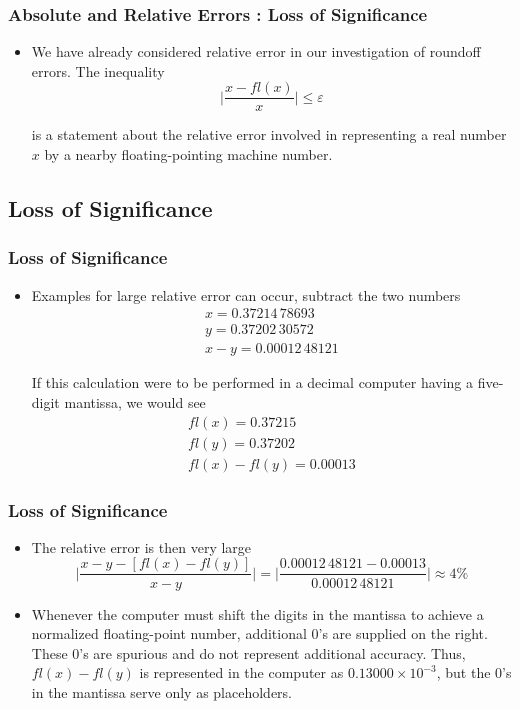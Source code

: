 \documentclass[notheorems,mathserif,table,compress]{beamer}  %
\begin{document}
\begin{frame}
\frametitle{Absolute and Relative Errors : Loss of Significance}
\begin{itemize}
\item We have already considered relative error in our investigation of roundoff errors. The inequality 
\begin{displaymath}
\bigg|\frac{x-fl(x)}{x}\bigg|\leq \varepsilon
\end{displaymath}

is a statement about the relative error involved in representing a real number $x$ by a nearby floating-pointing machine number.
\end{itemize}
\end{frame}

\subsection{Loss of Significance} 

\begin{frame}
\frametitle{Loss of Significance}
\begin{itemize}
\item Examples for large relative error can occur, subtract the two numbers
\begin{eqnarray*}
x=0.37214\,78693 \\
y=0.37202\,30572 \\
x−y=0.00012\,48121
\end{eqnarray*}

If this calculation were to be performed in a decimal computer having a five-digit mantissa, we would see
\begin{eqnarray*}
fl(x)=0.37215 \\
fl(y)=0.37202 \\
fl(x)−fl(y)=0.00013
\end{eqnarray*}

\end{itemize}
\end{frame}

\begin{frame}
\frametitle{Loss of Significance}
\begin{itemize}
\item The relative error is then very large
\begin{displaymath}
\bigg|\frac{x-y-[fl(x)-fl(y)]}{x-y}\bigg|=\bigg|\frac{0.00012\,48121-0.00013}{0.00012\,48121}\bigg|\approx4\%
\end{displaymath}

\item Whenever the computer must shift the digits in the mantissa to achieve a normalized floating-point number, additional 0's are supplied on the right. These 0's are spurious and do not represent additional accuracy. Thus, $fl(x)-fl(y)$ is represented in the computer as $0.13000\times10^{-3}$, but the 0's in the mantissa serve only as placeholders.
\end{itemize}
\end{frame}
\end{document}
